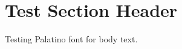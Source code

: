 \documentclass[palatino]{ui1activity}
\begin{document}
\section{Test Section Header}
Testing Palatino font for body text.
\end{document}
